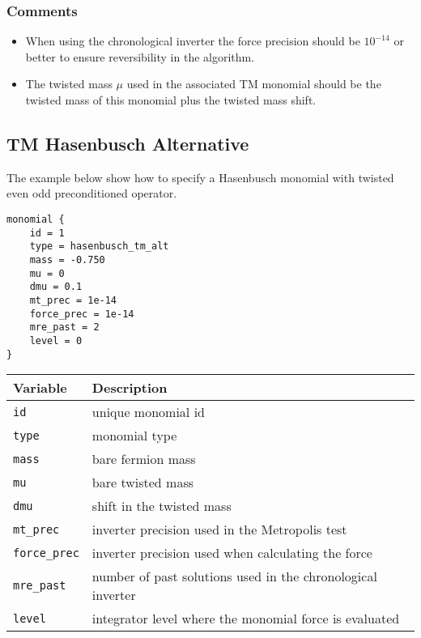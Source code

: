 \documentclass[12pt]{article}
\begin{document}
\subsubsection*{Comments}
\begin{itemize}
 \item When using the chronological inverter the force precision should be $10^{-14}$ or better to ensure reversibility in the algorithm.
 \item The twisted mass $\mu$ used in the associated TM monomial should be the twisted mass of this monomial plus the twisted mass shift.
\end{itemize}

\newpage
\subsection*{TM Hasenbusch Alternative}
The example below show how to specify a Hasenbusch monomial with twisted even odd preconditioned operator.
\begin{center}
\begin{minipage}{70mm}
\begin{framed}
\begin{verbatim}
monomial {
    id = 1
    type = hasenbusch_tm_alt
    mass = -0.750
    mu = 0
    dmu = 0.1
    mt_prec = 1e-14
    force_prec = 1e-14
    mre_past = 2
    level = 0
}
\end{verbatim}
\vspace{-5mm}
\end{framed}
\end{minipage}
\end{center}

\vspace{2mm}

\begin{center}
\begin{tabular}{l|l}
 Variable & Description \\
 \hline
 \verb|id|         & unique monomial id \\
 \verb|type|       & monomial type \\
 \verb|mass|       & bare fermion mass \\
 \verb|mu|         & bare twisted mass \\
 \verb|dmu|        & shift in the twisted  mass \\
 \verb|mt_prec|    & inverter precision used in the Metropolis test \\
 \verb|force_prec| & inverter precision used when calculating the force \\
 \verb|mre_past|   & number of past solutions used in the chronological inverter \\
 \verb|level|      & integrator level where the monomial force is evaluated
\end{tabular}
\end{center}
\end{document}
